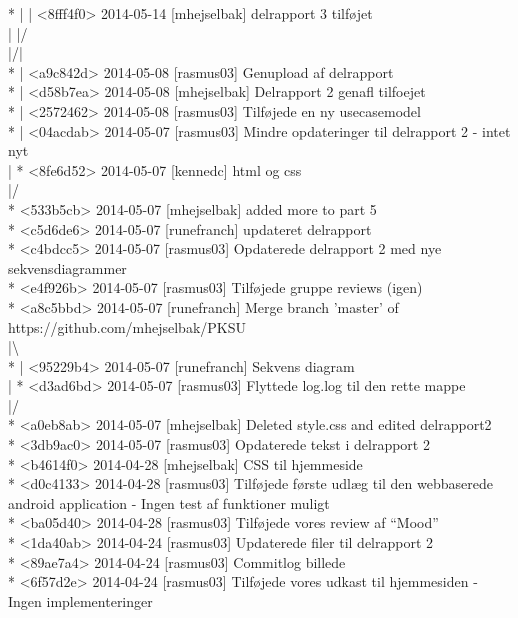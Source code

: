 \documentclass[12pt]{article}
\begin{document}
* | | <8fff4f0> 2014-05-14 [mhejselbak]  delrapport 3 tilføjet\\
| |/  \\
|/|   \\
* | <a9c842d> 2014-05-08 [rasmus03]  Genupload af delrapport\\
* | <d58b7ea> 2014-05-08 [mhejselbak]  Delrapport 2 genafl tilfoejet\\
* | <2572462> 2014-05-08 [rasmus03]  Tilføjede en ny usecasemodel\\
* | <04acdab> 2014-05-07 [rasmus03]  Mindre opdateringer til delrapport 2 - intet nyt\\
| * <8fe6d52> 2014-05-07 [kennedc]  html og css\\
|/  \\
* <533b5cb> 2014-05-07 [mhejselbak]  added more to part 5\\
* <c5d6de6> 2014-05-07 [runefranch]  updateret delrapport\\
* <c4bdcc5> 2014-05-07 [rasmus03]  Opdaterede delrapport 2 med nye sekvensdiagrammer\\
* <e4f926b> 2014-05-07 [rasmus03]  Tilføjede gruppe reviews (igen)\\
*   <a8c5bbd> 2014-05-07 [runefranch]  Merge branch 'master' of https://github.com/mhejselbak/PKSU\\
|\textbackslash \\  
* | <95229b4> 2014-05-07 [runefranch]  Sekvens diagram \\
| * <d3ad6bd> 2014-05-07 [rasmus03]  Flyttede log.log til den rette mappe \\
|/  \\
* <a0eb8ab> 2014-05-07 [mhejselbak]  Deleted style.css and edited delrapport2 \\
* <3db9ac0> 2014-05-07 [rasmus03]  Opdaterede tekst i delrapport 2\\
* <b4614f0> 2014-04-28 [mhejselbak]  CSS til hjemmeside\\
* <d0c4133> 2014-04-28 [rasmus03]  Tilføjede første udlæg til den webbaserede android application - Ingen test af funktioner muligt\\
* <ba05d40> 2014-04-28 [rasmus03]  Tilføjede vores review af “Mood”\\
* <1da40ab> 2014-04-24 [rasmus03]  Updaterede filer til delrapport 2\\
* <89ae7a4> 2014-04-24 [rasmus03]  Commitlog billede\\
* <6f57d2e> 2014-04-24 [rasmus03]  Tilføjede vores udkast til hjemmesiden - Ingen implementeringer\\
\end{document}
